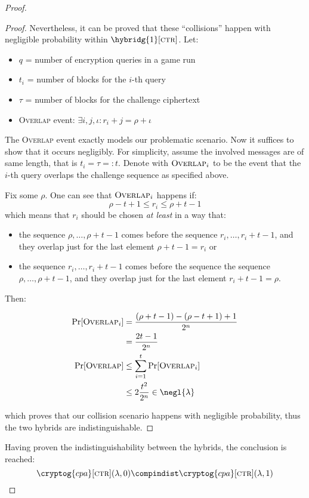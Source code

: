 \begin{proof}
\begin{proof}
        Nevertheless, it can be proved that these ``collisions'' happen with negligible probability within $\hybridg{1}[\textsc{ctr}]$. Let:
        \begin{itemize}
            \item $q$ = number of encryption queries in a game run
            \item $t_i$ = number of blocks for the $i$-th query
            \item $\tau$ = number of blocks for the challenge ciphertext
            \item \textsc{Overlap} event: $\exists i, j, \iota : r_i + j = \rho + \iota$
        \end{itemize}

        The \textsc{Overlap} event exactly models our problematic scenario. Now it suffices to show that it occurs negligibly. For simplicity, assume the involved messages are of same length, that is $t_i = \tau =: t$. Denote with $\textsc{Overlap}_i$ to be the event that the $i$-th query overlaps the challenge sequence as specified above.

        Fix some $\rho$. One can see that $\textsc{Overlap}_i$ happens if:
        \[
            \rho - t + 1 \leq r_i \leq \rho + t - 1
        \]
        which means that $r_i$ should be chosen \emph{at least} in a way that:
        \begin{itemize}
            \item the sequence $\rho, \dots, \rho + t - 1$ comes before the sequence $r_i, \dots, r_i + t - 1$, and they overlap just for the last element $\rho + t - 1 = r_i$ or
            \item the sequence $r_i, \dots, r_i + t - 1$ comes before the sequence the sequence $\rho, \dots, \rho + t - 1$, and they overlap just for the last element $r_i + t - 1 = \rho$.
        \end{itemize}

        Then:

        \begin{align*}
            \Pr[\textsc{Overlap}_i] &= \frac{(\rho + t - 1) - (\rho - t + 1) + 1}{2^n} \\
            &= \frac{2t-1}{2^n} \\
            \Pr[\textsc{Overlap}] &\leq \sum_{i = 1}^{t} \Pr[\textsc{Overlap}_i] \\
            &\leq 2 \frac{t^2}{2^n} \in \negl{\lambda} 
        \end{align*}
            
        which proves that our collision scenario happens with negligible probability, thus the two hybrids are indistinguishable.

    \end{proof}
    
    Having proven the indistinguishability between the hybrids, the conclusion is reached:
    \[
        \cryptog{cpa}[\textsc{ctr}](\lambda, 0) \compindist \cryptog{cpa}[\textsc{ctr}](\lambda, 1)
    \]
    
\end{proof}
